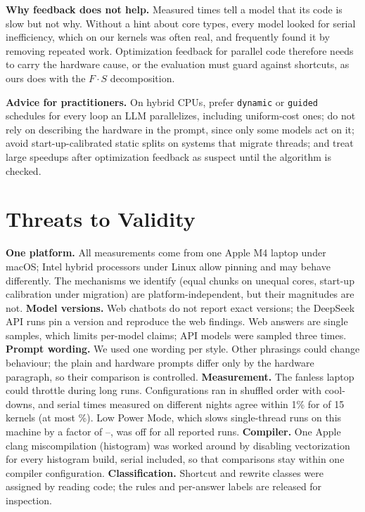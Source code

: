 \documentclass[conference]{IEEEtran}
\begin{document}
\textbf{Why feedback does not help.} Measured times tell a model that its code is slow but not why. Without a hint about core types, every model looked for serial inefficiency, which on our kernels was often real, and frequently found it by removing repeated work. Optimization feedback for parallel code therefore needs to carry the hardware cause, or the evaluation must guard against shortcuts, as ours does with the $F\cdot S$ decomposition.

\textbf{Advice for practitioners.} On hybrid CPUs, prefer \texttt{dynamic} or \texttt{guided} schedules for every loop an LLM parallelizes, including uniform-cost ones; do not rely on describing the hardware in the prompt, since only some models act on it; avoid start-up-calibrated static splits on systems that migrate threads; and treat large speedups after optimization feedback as suspect until the algorithm is checked.

\section{Threats to Validity}
\textbf{One platform.} All measurements come from one Apple M4 laptop under macOS; Intel hybrid processors under Linux allow pinning and may behave differently. The mechanisms we identify (equal chunks on unequal cores, start-up calibration under migration) are platform-independent, but their magnitudes are not.
\textbf{Model versions.} Web chatbots do not report exact versions; the DeepSeek API runs pin a version and reproduce the web findings. Web answers are single samples, which limits per-model claims; API models were sampled three times.
\textbf{Prompt wording.} We used one wording per style. Other phrasings could change behaviour; the plain and hardware prompts differ only by the hardware paragraph, so their comparison is controlled.
\textbf{Measurement.} The fanless laptop could throttle during long runs. Configurations ran in shuffled order with cool-downs, and serial times measured on different nights agree within 1\% for \NumReproWithinOne{} of 15 kernels (at most \NumReproMaxDev\%). Low Power Mode, which slows single-thread runs on this machine by a factor of \NumLpmMin--\NumLpmMax, was off for all reported runs.
\textbf{Compiler.} One Apple clang miscompilation (histogram) was worked around by disabling vectorization for every histogram build, serial included, so that comparisons stay within one compiler configuration.
\textbf{Classification.} Shortcut and rewrite classes were assigned by reading code; the rules and per-answer labels are released for inspection.
\end{document}
